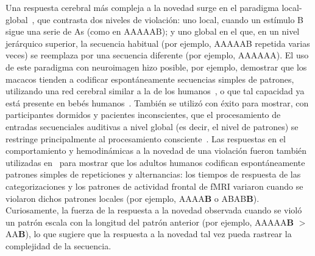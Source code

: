 Una respuesta cerebral más compleja a la novedad surge en el paradigma local-global~\cite{f67,f68}, que contrasta dos niveles de violación: uno local, cuando un estímulo B sigue una serie de As (como en AAAAAB); y uno global en el que, en un nivel jerárquico superior, la secuencia habitual (por ejemplo, AAAAAB repetida varias veces) se reemplaza por una secuencia diferente (por ejemplo, AAAAAA). El uso de este paradigma con neuroimagen hizo posible, por ejemplo, demostrar que los macacos tienden a codificar espontáneamente secuencias simples de patrones, utilizando una red cerebral similar a la de los humanos~\cite{f13,f66,f69}, o que tal capacidad ya está presente en bebés humanos~\cite{f70}. También se utilizó con éxito para mostrar, con participantes dormidos y pacientes inconscientes, que el procesamiento de entradas secuenciales auditivas a nivel global (es decir, el nivel de patrones) se restringe principalmente al procesamiento consciente~\cite{f67,f71,f72}. Las respuestas en el comportamiento y hemodinámicas a la novedad de una violación fueron también utilizadas en~\cite{f19} para mostrar que los adultos humanos codifican espontáneamente patrones simples de repeticiones y alternancias: los tiempos de respuesta de las categorizaciones y los patrones de actividad frontal de fMRI variaron cuando se violaron dichos patrones locales (por ejemplo, AAAA\textbf{B} o ABAB\textbf{B}). Curiosamente, la fuerza de la respuesta a la novedad observada cuando se violó un patrón escala con la longitud del patrón anterior (por ejemplo, AAAAA\textbf{B} $>$ AA\textbf{B}), lo que sugiere que la respuesta a la novedad tal vez pueda rastrear la complejidad de la secuencia.


